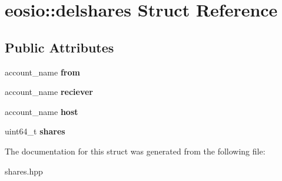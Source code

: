 \hypertarget{structeosio_1_1delshares}{}\section{eosio\+:\+:delshares Struct Reference}
\label{structeosio_1_1delshares}
\subsection*{Public Attributes}
\begin{DoxyCompactItemize}
\item 
\mbox{\label{structeosio_1_1delshares_a3d9ca854838370a3b5d31db5b2d702c0}} 
account\+\_\+name {\bfseries from}
\item 
\mbox{\label{structeosio_1_1delshares_ab32b533a475cd27ae9d0744cacabbea4}} 
account\+\_\+name {\bfseries reciever}
\item 
\mbox{\label{structeosio_1_1delshares_ae01f6cbf7bf28ad667bf7be475d2eda0}} 
account\+\_\+name {\bfseries host}
\item 
\mbox{\label{structeosio_1_1delshares_a701468317ff17079033e9886c87c30b2}} 
uint64\+\_\+t {\bfseries shares}
\end{DoxyCompactItemize}


The documentation for this struct was generated from the following file\+:\begin{DoxyCompactItemize}
\item 
shares.\+hpp\end{DoxyCompactItemize}
